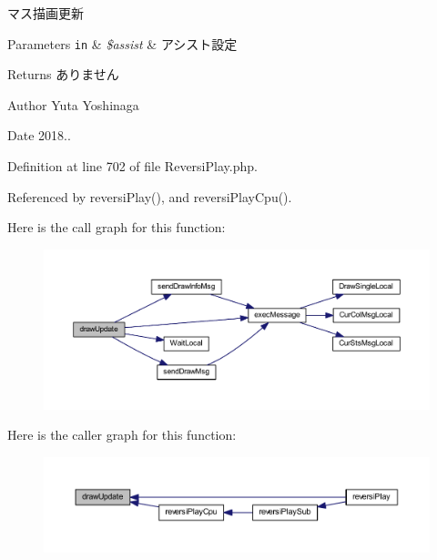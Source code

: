 マス描画更新 


\begin{DoxyParams}[1]{Parameters}
\mbox{\tt in}  & {\em \$assist} & アシスト設定 \\
\hline
\end{DoxyParams}
\begin{DoxyReturn}{Returns}
ありません 
\end{DoxyReturn}
\begin{DoxyAuthor}{Author}
Yuta Yoshinaga 
\end{DoxyAuthor}
\begin{DoxyDate}{Date}
2018.. 
\end{DoxyDate}


Definition at line 702 of file Reversi\+Play.\+php.



Referenced by reversi\+Play(), and reversi\+Play\+Cpu().

Here is the call graph for this function\+:
\nopagebreak
\begin{figure}[H]
\begin{center}
\leavevmode
\includegraphics[width=350pt]{class_reversi_play_a52029e5f2e049767d1f67c3f5c18ce9f_cgraph}
\end{center}
\end{figure}
Here is the caller graph for this function\+:
\nopagebreak
\begin{figure}[H]
\begin{center}
\leavevmode
\includegraphics[width=350pt]{class_reversi_play_a52029e5f2e049767d1f67c3f5c18ce9f_icgraph}
\end{center}
\end{figure}
\mbox{\label{class_reversi_play_a3ae28eb121caf59932218ea7d1fca81d}} 
